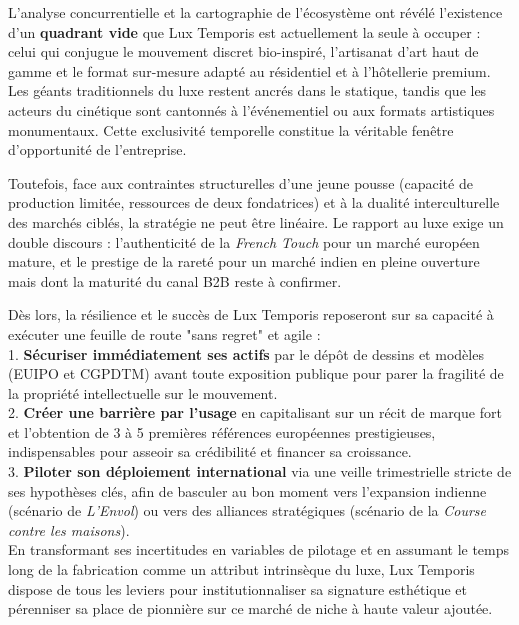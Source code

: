 \documentclass[11pt,a4paper]{article}
\begin{document}
L'analyse concurrentielle et la cartographie de l'écosystème ont révélé l'existence d'un \textbf{quadrant vide }  que Lux Temporis est actuellement la seule à occuper : celui qui conjugue le mouvement discret bio-inspiré, l'artisanat d'art haut de gamme et le format sur-mesure adapté au résidentiel et à l'hôtellerie premium. Les géants traditionnels du luxe restent ancrés dans le statique, tandis que les acteurs du cinétique sont cantonnés à l'événementiel ou aux formats artistiques monumentaux. Cette exclusivité temporelle constitue la véritable fenêtre d'opportunité de l'entreprise.

Toutefois, face aux contraintes structurelles d'une jeune pousse (capacité de production limitée, ressources de deux fondatrices) et à la dualité interculturelle des marchés ciblés, la stratégie ne peut être linéaire. Le rapport au luxe exige un double discours : l'authenticité de la \textit{French Touch} pour un marché européen mature, et le prestige de la rareté pour un marché indien en pleine ouverture mais dont la maturité du canal B2B reste à confirmer.

Dès lors, la résilience et le succès de Lux Temporis reposeront sur sa capacité à exécuter une feuille de route "sans regret" et agile : \\

 
1. \textbf{Sécuriser immédiatement ses actifs} par le dépôt de dessins et modèles (EUIPO et CGPDTM) avant toute exposition publique pour parer la fragilité de la propriété intellectuelle sur le mouvement.\\


2. \textbf{Créer une barrière par l'usage} en capitalisant sur un récit de marque fort et l'obtention de 3 à 5 premières références européennes prestigieuses, indispensables pour asseoir sa crédibilité et financer sa croissance.\\


3. \textbf{Piloter son déploiement international} via une veille trimestrielle stricte de ses hypothèses clés, afin de basculer au bon moment vers l'expansion indienne (scénario de \textit{L'Envol}) ou vers des alliances stratégiques (scénario de la \textit{Course contre les maisons}).\\



En transformant ses incertitudes en variables de pilotage et en assumant le temps long de la fabrication comme un attribut intrinsèque du luxe, Lux Temporis dispose de tous les leviers pour institutionnaliser sa signature esthétique et pérenniser sa place de pionnière sur ce marché de niche à haute valeur ajoutée.
\end{document}
